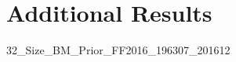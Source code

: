 
\section{Additional Results} \label{sec:addl_results}

\begin{landscape}

\begin{table}%
  \scriptsize
  \centering
  \caption{32 Size, value and investment sorts -- 1963-07 through 2016-12}%
  \qquad
\end{table}

\end{landscape}

\begin{landscape}
{32_Size_BM_Prior_FF2016_196307_201612}
\end{landscape}

